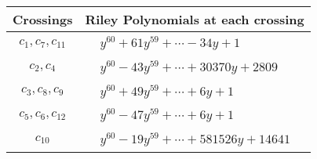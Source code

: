 \documentclass[1p]{elsarticle_modified}
\theoremstyle{definition}
\begin{document}
\begin{tabular}{m{50pt}|m{274pt}}
Crossings & \hspace{64pt}Riley Polynomials at each crossing \\
\hline $$\begin{aligned}c_{1},c_{7},c_{11}\end{aligned}$$&$\begin{aligned}
&y^{60}+61 y^{59}+\cdots-34 y+1
\end{aligned}$\\
\hline $$\begin{aligned}c_{2},c_{4}\end{aligned}$$&$\begin{aligned}
&y^{60}-43 y^{59}+\cdots+30370 y+2809
\end{aligned}$\\
\hline $$\begin{aligned}c_{3},c_{8},c_{9}\end{aligned}$$&$\begin{aligned}
&y^{60}+49 y^{59}+\cdots+6 y+1
\end{aligned}$\\
\hline $$\begin{aligned}c_{5},c_{6},c_{12}\end{aligned}$$&$\begin{aligned}
&y^{60}-47 y^{59}+\cdots+6 y+1
\end{aligned}$\\
\hline $$\begin{aligned}c_{10}\end{aligned}$$&$\begin{aligned}
&y^{60}-19 y^{59}+\cdots+581526 y+14641
\end{aligned}$\\
\hline
\end{tabular}
\vskip 2pc
\end{document}
